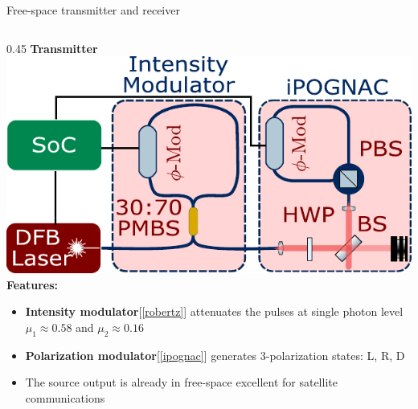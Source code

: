 \documentclass[final]{beamer}
\begin{document}
\begin{frame}
\begin{textblock}{0.96}
\begin{block}{\large {Free-space transmitter and receiver}}
\begin{columns}
				\begin{column}{0.45\TPHorizModule}
					{\textbf{Transmitter\\}}
					\vskip 0.6cm
					\includegraphics[scale=2.3]{imgs/trasmitter_800_nm_esa_opl.pdf}\\
					{\textbf{Features:\\}}
					\begin{itemize}
						\item \textbf{Intensity modulator}[\ref{robertz}] attenuates the pulses at single photon level $\mu_1 \approx 0.58$ and $\mu_2 \approx 0.16$
						\item \textbf{Polarization modulator}[\ref{ipognac}] generates 3-polarization states: L, R, D
						\item The source output is already in free-space excellent for satellite communications
					\end{itemize}
				\end{column}



\end{columns}
\end{block}
\end{textblock}
\end{frame}
\end{document}
